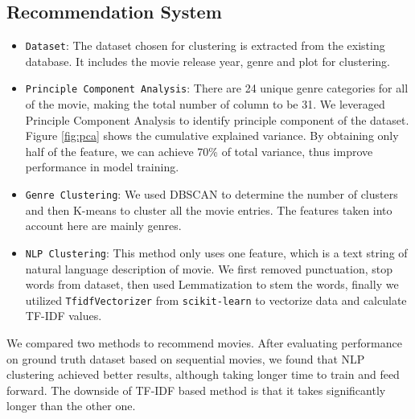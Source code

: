 \documentclass[journal]{IEEEtran}
\theoremstyle{mydefstyle}
\begin{document}
\subsection{Recommendation System}
\begin{itemize}
    \item \texttt{Dataset}: The dataset chosen for clustering is extracted from the existing database. It includes the movie release year, genre and plot for clustering.

    \item \texttt{Principle Component Analysis}: There are 24 unique genre categories for all of the movie, making the total number of column to be 31. We leveraged Principle Component Analysis to identify principle component of the dataset. Figure \ref{fig:pca} shows the cumulative explained variance. By obtaining only half of the feature, we can achieve 70\% of total variance, thus improve performance in model training.

    \item \texttt{Genre Clustering}: We used DBSCAN to determine the number of clusters and then K-means to cluster all the movie entries. The features taken into account here are mainly genres.

    \item \texttt{NLP Clustering}: This method only uses one feature, which is a text string of natural language description of movie. We first removed punctuation, stop words from dataset, then used Lemmatization to stem the words, finally we utilized \texttt{TfidfVectorizer} from \texttt{scikit-learn} to vectorize data and calculate TF-IDF values.
    


\end{itemize}
We compared two methods to recommend movies. After evaluating performance on ground truth dataset based on sequential movies, we found that NLP clustering achieved better results, although taking longer time to train and feed forward. The downside of TF-IDF based method is that it takes significantly longer than the other one.
\end{document}

